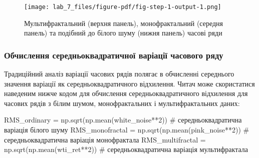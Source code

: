 \documentclass[
  letterpaper,
]{report}
\newenvironment{Shaded}{\begin{snugshade}}{\end{snugshade}}
\newcommand{\CommentTok}[1]{\textcolor[rgb]{0.37,0.37,0.37}{#1}}
\newcommand{\DecValTok}[1]{\textcolor[rgb]{0.68,0.00,0.00}{#1}}
\newcommand{\NormalTok}[1]{\textcolor[rgb]{0.00,0.23,0.31}{#1}}
\newcommand{\OperatorTok}[1]{\textcolor[rgb]{0.37,0.37,0.37}{#1}}
\begin{document}
\begin{figure}[H]

{\centering \texttt{[image: lab\_7\_files/figure-pdf/fig-step-1-output-1.png]}

}

\caption{\label{fig-step-1}Мультифрактальний (верхня панель),
монофрактальний (середня панель) та подібний до білого шуму (нижня
панель) часові ряди}

\end{figure}

\hypertarget{ux43eux431ux447ux438ux441ux43bux435ux43dux43dux44f-ux441ux435ux440ux435ux434ux43dux44cux43eux43aux432ux430ux434ux440ux430ux442ux438ux447ux43dux43eux457-ux432ux430ux440ux456ux430ux446ux456ux457-ux447ux430ux441ux43eux432ux43eux433ux43e-ux440ux44fux434ux443}{%
\subsubsection{Обчислення середньоквадратичної варіації часового
ряду}\label{ux43eux431ux447ux438ux441ux43bux435ux43dux43dux44f-ux441ux435ux440ux435ux434ux43dux44cux43eux43aux432ux430ux434ux440ux430ux442ux438ux447ux43dux43eux457-ux432ux430ux440ux456ux430ux446ux456ux457-ux447ux430ux441ux43eux432ux43eux433ux43e-ux440ux44fux434ux443}}

Традиційний аналіз варіації часових рядів полягає в обчисленні
середнього значення варіації як середньоквадратичного відхилення. Читач
може скористатися наведеним нижче кодом для обчислення
середньоквадратичного відхилення для часових рядів з білим шумом,
монофрактальних і мультифрактальних даних:

\begin{Shaded}
\begin{Highlighting}[]
\NormalTok{RMS\_ordinary }\OperatorTok{=}\NormalTok{ np.sqrt(np.mean(white\_noise}\OperatorTok{**}\DecValTok{2}\NormalTok{))    }\CommentTok{\# середньоквадратична варіація білого шуму}
\NormalTok{RMS\_monofractal }\OperatorTok{=}\NormalTok{ np.sqrt(np.mean(pink\_noise}\OperatorTok{**}\DecValTok{2}\NormalTok{))  }\CommentTok{\# середньоквадратична варіація монофрактала}
\NormalTok{RMS\_multifractal }\OperatorTok{=}\NormalTok{ np.sqrt(np.mean(wti\_ret}\OperatorTok{**}\DecValTok{2}\NormalTok{))    }\CommentTok{\# середньоквадратична варіація мультифрактала}
\end{Highlighting}
\end{Shaded}
\end{document}
